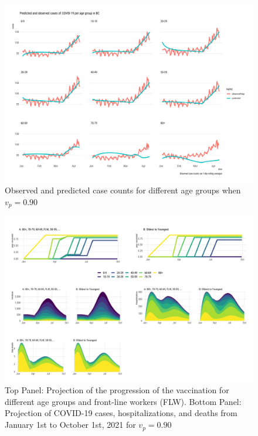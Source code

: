 \begin{figure}[htb]
\begin{center}
\includegraphics[width=6in]{"../figures/vp0.90/fig-validation.pdf"}
\caption{Observed and predicted case counts for different age groups when $v_p=0.90$}
\end{center}
\end{figure}

\begin{figure}[htb]
\begin{center}
\includegraphics[width=6in]{"../figures/vp0.90/fig-trajectoriesFull.pdf"}
\caption{Top Panel: Projection of the progression of the vaccination for different age groups and front-line workers (FLW). Bottom Panel: Projection of COVID-19 cases, hospitalizations, and deaths from January 1st to October 1st, 2021 for $v_p=0.90$}
\end{center}
\end{figure}


